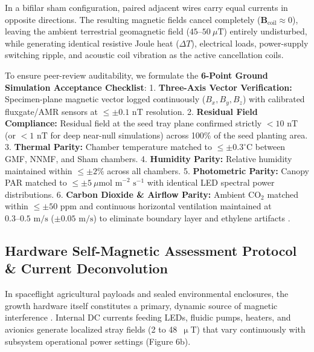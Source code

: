 \documentclass[default,sn-nature,iicol]{sn-jnl}
\begin{document}
In a bifilar sham configuration, paired adjacent wires carry equal currents in opposite directions. The resulting magnetic fields cancel completely ($\mathbf{B}_{\text{coil}} \approx 0$), leaving the ambient terrestrial geomagnetic field ($45\text{--}50\ \mu\text{T}$) entirely undisturbed, while generating identical resistive Joule heat ($\Delta T$), electrical loads, power-supply switching ripple, and acoustic coil vibration as the active cancellation coils. 

To ensure peer-review auditability, we formulate the \textbf{6-Point Ground Simulation Acceptance Checklist}:
1. \textbf{Three-Axis Vector Verification:} Specimen-plane magnetic vector logged continuously ($B_x, B_y, B_z$) with calibrated fluxgate/AMR sensors at $\le \pm 0.1\text{ nT}$ resolution.
2. \textbf{Residual Field Compliance:} Residual field at the seed tray plane confirmed strictly $<10\text{ nT}$ (or $<1\text{ nT}$ for deep near-null simulations) across 100\% of the seed planting area.
3. \textbf{Thermal Parity:} Chamber temperature matched to $\le \pm 0.3^\circ\text{C}$ between GMF, NNMF, and Sham chambers.
4. \textbf{Humidity Parity:} Relative humidity maintained within $\le \pm 2\%$ across all chambers.
5. \textbf{Photometric Parity:} Canopy PAR matched to $\le \pm 5\ \mu\text{mol m}^{-2}\text{ s}^{-1}$ with identical LED spectral power distributions.
6. \textbf{Carbon Dioxide \& Airflow Parity:} Ambient $\text{CO}_2$ matched within $\le \pm 50\text{ ppm}$ and continuous horizontal ventilation maintained at $0.3\text{--}0.5\text{ m/s}$ ($\pm 0.05\text{ m/s}$) to eliminate boundary layer and ethylene artifacts \cite{ref7,ref40}.


\subsection{Hardware Self-Magnetic Assessment Protocol \& Current Deconvolution}
In spaceflight agricultural payloads and sealed environmental enclosures, the growth hardware itself constitutes a primary, dynamic source of magnetic interference \cite{ref11}. Internal DC currents feeding LEDs, fluidic pumps, heaters, and avionics generate localized stray fields (2 to 48~$\upmu$T) that vary continuously with subsystem operational power settings (Figure 6b). 
\end{document}
